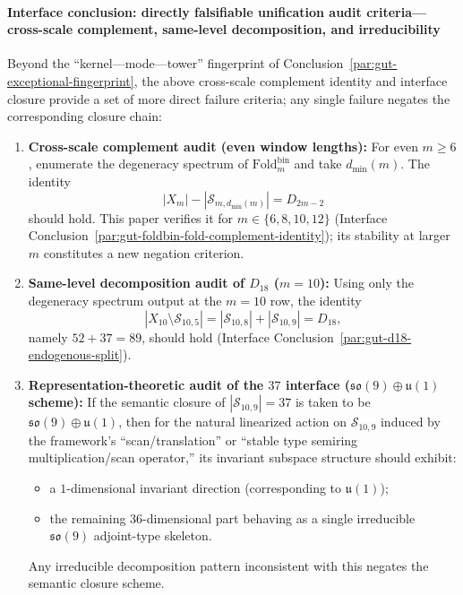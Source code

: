 \paragraph{Interface conclusion: directly falsifiable unification audit criteria---cross-scale complement, same-level decomposition, and irreducibility}\label{par:gut-foldbin-fold-audit-criteria}
Beyond the ``kernel---mode---tower'' fingerprint of Conclusion~\ref{par:gut-exceptional-fingerprint}, the above cross-scale complement identity and interface closure provide a set of more direct failure criteria; any single failure negates the corresponding closure chain:
\begin{enumerate}
  \item \textbf{Cross-scale complement audit (even window lengths):} For even \(m\ge 6\), enumerate the degeneracy spectrum of \(\mathrm{Fold}^{\mathrm{bin}}_m\) and take \(d_{\min}(m)\). The identity
  \[
  |X_m|-|\mathcal{S}_{m,d_{\min}(m)}|=D_{2m-2}
  \]
  should hold. This paper verifies it for \(m\in\{6,8,10,12\}\) (Interface Conclusion~\ref{par:gut-foldbin-fold-complement-identity}); its stability at larger \(m\) constitutes a new negation criterion.
  \item \textbf{Same-level decomposition audit of \texorpdfstring{$D_{18}$}{D18} (\texorpdfstring{$m=10$}{m=10}):} Using only the degeneracy spectrum output at the \(m=10\) row, the identity
  \[
  |X_{10}\setminus\mathcal{S}_{10,5}|=|\mathcal{S}_{10,8}|+|\mathcal{S}_{10,9}|=D_{18},
  \]
  namely \(52+37=89\), should hold (Interface Conclusion~\ref{par:gut-d18-endogenous-split}).
  \item \textbf{Representation-theoretic audit of the \texorpdfstring{$37$}{37} interface (\texorpdfstring{$\mathfrak{so}(9)\oplus\mathfrak{u}(1)$}{so(9)+u(1)} scheme):}
  If the semantic closure of \(|\mathcal{S}_{10,9}|=37\) is taken to be \(\mathfrak{so}(9)\oplus\mathfrak{u}(1)\), then for the natural linearized action on \(\mathcal{S}_{10,9}\) induced by the framework's ``scan/translation'' or ``stable type semiring multiplication/scan operator,'' its invariant subspace structure should exhibit:
  \begin{itemize}
    \item a \(1\)-dimensional invariant direction (corresponding to \(\mathfrak{u}(1)\));
    \item the remaining \(36\)-dimensional part behaving as a single irreducible \(\mathfrak{so}(9)\) adjoint-type skeleton.
  \end{itemize}
  Any irreducible decomposition pattern inconsistent with this negates the semantic closure scheme.
\end{enumerate}

